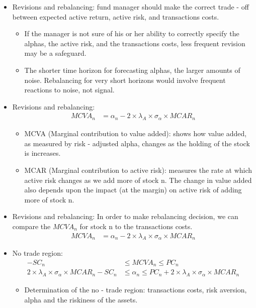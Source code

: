 \begin{itemize}
\begin{itemize}
    \item Revisions and rebalancing: fund manager should make the correct trade - off between expected active return, active risk, and transactions costs.
        \begin{itemize}
        \item If the manager is not sure of his or her ability to correctly specify the alphas, the active risk, and the transactions costs, less frequent revision may be a safeguard.
        \item The shorter time horizon for forecasting alphas, the larger amounts of noise. Rebalancing for very short horizons would involve frequent reactions to noise, not signal.
        \end{itemize}
    \item Revisions and rebalancing:
    \begin{align*}
    MCVA_n &= \alpha_n - 2 \times \lambda_A \times \sigma_{\alpha} \times MCAR_n
    \end{align*}
        \begin{itemize}
        \item MCVA (Marginal contribution to value added): shows how value added, as measured by risk - adjusted alpha, changes as the holding of the stock is increases.
        \item MCAR (Marginal contribution to active risk): measures the rate at which active risk changes as we add more of stock n. The change in value added also depends upon the impact (at the margin) on active risk of adding more of stock n.
        \end{itemize}
    \item Revisions and rebalancing: In order to make rebalancing decision, we can compare the $MCVA_n$ for stock n to the transactions costs.
    \begin{align*}
    MCVA_n &= \alpha_n - 2 \times \lambda_A \times \sigma_{\alpha} \times MCAR_n
    \end{align*}
    \item No trade region:
    \begin{align*}
     - SC_n &\leq MCVA_n \leq PC_n \\
    2 \times \lambda_A \times \sigma_{\alpha} \times MCAR_n - SC_n &\leq \alpha_n \leq PC_n + 2 \times \lambda_A \times \sigma_{\alpha} \times MCAR_n
    \end{align*}
        \begin{itemize}
        \item Determination of the no - trade region: transactions costs, risk aversion, alpha and the riskiness of the assets.
        \end{itemize}
    \end{itemize}   


\end{itemize}
